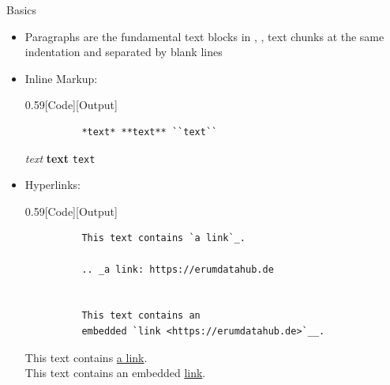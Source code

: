 \begin{frame}[fragile]{
    \reST{} Basics
    \hfill
  }
  \begin{itemize}
    \setlength{\itemsep}{1em}
    \item Paragraphs are the fundamental text blocks in \reST, \ie, text chunks at the same
      indentation and separated by blank lines
    \item Inline Markup:
      \begin{CodeExplanation}{0.59}[Code][Output]
        \begin{verbatim}
          *text* **text** ``text``
        \end{verbatim}
      \Explanation
        \textit{text} \textbf{text} \texttt{text}
      \end{CodeExplanation}
    \item Hyperlinks:
      \begin{CodeExplanation}{0.59}[Code][Output]
        \begin{verbatim}
          This text contains `a link`_.

          .. _a link: https://erumdatahub.de


          This text contains an
          embedded `link <https://erumdatahub.de>`__.
        \end{verbatim}
      \Explanation
        This text contains \href{https://erumdatahub.de}{a link}.\\[1em]

        This text contains an embedded \href{https://erumdatahub.de}{link}.
      \end{CodeExplanation}
  \end{itemize}
\end{frame}

